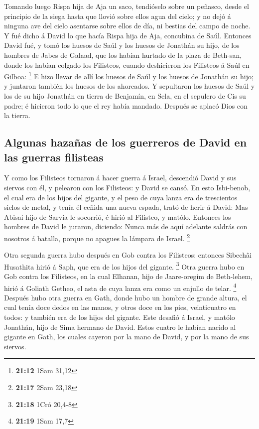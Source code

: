  Tomando luego Rispa hija de Aja un saco, tendióselo
sobre un peñasco, desde el principio de la siega hasta que llovió sobre
ellos agua del cielo; y no dejó á ninguna ave del cielo asentarse sobre
ellos de día, ni bestias del campo de noche.  Y fué dicho
á David lo que hacía Rispa hija de Aja, concubina de Saúl.
 Entonces David fué, y tomó los huesos de Saúl y los
huesos de Jonathán su hijo, de los hombres de Jabes de Galaad, que los
habían hurtado de la plaza de Beth-san, donde los habían colgado los
Filisteos, cuando deshicieron los Filisteos á Saúl en Gilboa:
\footnote{\textbf{21:12} 1Sam 31,12}  E hizo llevar de
allí los huesos de Saúl y los huesos de Jonathán su hijo; y juntaron
también los huesos de los ahorcados.  Y sepultaron los
huesos de Saúl y los de su hijo Jonathán en tierra de Benjamín, en Sela,
en el sepulcro de Cis su padre; é hicieron todo lo que el rey había
mandado. Después se aplacó Dios con la tierra.

\hypertarget{algunas-hazauxf1as-de-los-guerreros-de-david-en-las-guerras-filisteas}{%
\subsection{Algunas hazañas de los guerreros de David en las guerras
filisteas}\label{algunas-hazauxf1as-de-los-guerreros-de-david-en-las-guerras-filisteas}}

 Y como los Filisteos tornaron á hacer guerra á Israel,
descendió David y sus siervos con él, y pelearon con los Filisteos: y
David se cansó.  En esto Isbi-benob, el cual era de los
hijos del gigante, y el peso de cuya lanza era de trescientos siclos de
metal, y tenía él ceñida una nueva espada, trató de herir á David:
 Mas Abisai hijo de Sarvia le socorrió, é hirió al
Filisteo, y matólo. Entonces los hombres de David le juraron, diciendo:
Nunca más de aquí adelante saldrás con nosotros á batalla, porque no
apagues la lámpara de Israel. \footnote{\textbf{21:17} 2Sam 23,18}

 Otra segunda guerra hubo después en Gob contra los
Filisteos: entonces Sibechâi Husathita hirió á Saph, que era de los
hijos del gigante. \footnote{\textbf{21:18} 1Cró 20,4-8} 
Otra guerra hubo en Gob contra los Filisteos, en la cual Elhanan, hijo
de Jaare-oregim de Beth-lehem, hirió á Goliath Getheo, el asta de cuya
lanza era como un enjullo de telar. \footnote{\textbf{21:19} 1Sam 17,7}
 Después hubo otra guerra en Gath, donde hubo un hombre
de grande altura, el cual tenía doce dedos en las manos, y otros doce en
los pies, veinticuatro en todos: y también era de los hijos del gigante.
 Este desafió á Israel, y matólo Jonathán, hijo de Sima
hermano de David.  Estos cuatro le habían nacido al
gigante en Gath, los cuales cayeron por la mano de David, y por la mano
de sus siervos.

